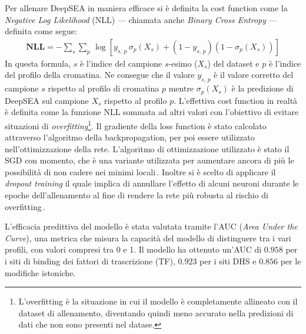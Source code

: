 Per allenare DeepSEA in maniera efficace si è definita la cost function come la \textit{Negative Log Likelihood} (\acs{NLL}) — chiamata anche \textit{Binary Cross Entropy} — definita come segue:
% 
\begin{gather*}
    \mathbf{NLL} = - \sum_s \sum_p\, \log\left[ y_{s,\,p}\,\sigma_p\left(X_s\right)  + \left( 1- y_{s,\,p} \right)\left(1 - \sigma_p\left(X_s\right) \right) \right]
\end{gather*}
% 
\noindent In questa formula, $s$ è l'indice del campione $s$-esimo ($X_s$) del dataset e $p$ è l'indice del profilo della cromatina. Ne consegue che il valore $y_{s,\,p}$ è il valore corretto del campione $s$ rispetto al profilo di cromatina $p$ mentre $\sigma_p\left(X_s\right)$ è la predizione di DeepSEA sul campione $X_s$ rispetto al profilo $p$. L'effettiva cost function in realtà è definita come la funzione \acs{NLL} sommata ad altri valori con l'obiettivo di evitare situazioni di \textit{overfitting}\footnote{L'overfitting è la situazione in cui il modello è completamente allineato con il dataset di allenamento, diventando quindi meno accurato nella predizioni di dati che non sono presenti nel datase.}. Il gradiente della loss function è stato calcolato attraverso l'algoritmo della backpropagation, per poi essere utilizzato nell'ottimizzazione della rete. L'algoritmo di ottimizzazione utilizzato è stato il \acs{SGD} con momento, che è una variante utilizzata per aumentare ancora di più le possibilità di non cadere nei minimi locali\,\cite{aggarwal2018neural}. Inoltre si è scelto di applicare il \textit{dropout training} il quale implica di annullare l'effetto di alcuni neuroni durante le epoche dell'allenamento al fine di rendere la rete più robusta al rischio di overfitting\,\cite{nielsen2015neural}.

L'efficacia predittiva del modello è stata valutata tramite l'AUC (\textit{Area Under the Curve}), una metrica che misura la capacità del modello di distinguere tra i vari profili, con valori compresi tra 0 e 1. Il modello ha ottenuto un'AUC di $0.958$ per i siti di binding dei fattori di trascrizione (\acs{TF}), $0.923$ per i siti \acs{DHS} e $0.856$ per le modifiche istoniche.

